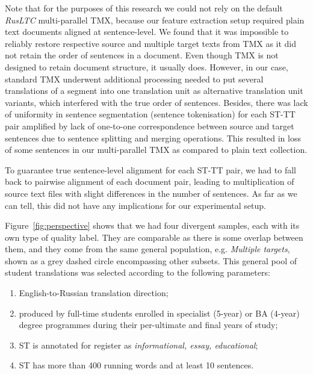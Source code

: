 
Note that for the purposes of this research we could not rely on the default \textit{RusLTC} multi-parallel TMX, because our feature extraction setup required plain text documents aligned at sentence-level. We found that it was impossible to reliably restore respective source and multiple target texts from TMX as it did not retain the order of sentences in a document. Even though TMX is not designed to retain document structure, it usually does. However, in our case, standard TMX underwent additional processing needed to put several translations of a segment into one translation unit as alternative translation unit variants, which interfered with the true order of sentences. Besides, there was lack of uniformity in sentence segmentation (sentence tokenisation) for each ST-TT pair amplified by lack of one-to-one correspondence between source and target sentences due to sentence splitting and merging operations. This resulted in loss of some sentences in our multi-parallel TMX as compared to plain text collection.

To guarantee true sentence-level alignment for each ST-TT pair, we had to fall back to pairwise alignment of each document pair, leading to multiplication of source text files with slight differences in the number of sentences. As far as we can tell, this did not have any implications for our experimental setup.

Figure~\ref{fig:perspective} shows that we had four divergent samples, each with its own type of quality label.
They are comparable as there is some overlap between them, and they come from the same general population, e.g. \textit{Multiple targets}, shown as a grey dashed circle encompassing other subsets. This general pool of student translations was selected according to the following parameters:
\begin{enumerate}\compresslist{}
	\item English-to-Russian translation direction;
	\item produced by full-time students enrolled in specialist (5-year) or BA (4-year) degree programmes during their per-ultimate and final years of study;
    \item ST is annotated for register as \textit{informational, essay, educational};
    \item ST has more than 400 running words and at least 10 sentences.
\end{enumerate}

